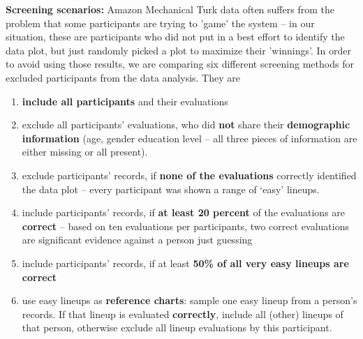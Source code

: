 \documentclass{article}
\newcommand{\hh}[1]{{\color{orange} #1}} %
\begin{document}
{\bf Screening scenarios:} \hh{Amazon Mechanical Turk data often suffers from the problem that some participants are trying to 'game' the system -- in our situation, these are participants who did not put in a best effort to identify the data plot, but just randomly picked a plot to maximize their 'winnings'.  In order to avoid using those results, we are comparing six different screening methods for excluded participants from the data analysis.} 
They are 
\begin{enumerate}
\item {\bf include all participants} and their evaluations
\item exclude all participants' evaluations, who did {\bf not} share their {\bf demographic information} (age, gender education level -- all three pieces of information are either missing or all present).
\item exclude participants' records, if {\bf none of the evaluations}  correctly identified the data plot -- every participant was shown a range of `easy' lineups.
\item include participants' records, if   {\bf at least 20 percent} of the evaluations are {\bf correct}  -- based on ten evaluations per participants, two correct evaluations are significant evidence against a person just guessing
\item include participants' records, if at least {\bf 50\% of all very easy lineups are correct} 
\item use easy lineups as {\bf reference charts}: sample one easy lineup from a person's records. If that lineup is evaluated {\bf correctly}, include all (other) lineups of that person, otherwise exclude all lineup evaluations by this participant.
\end{enumerate}
\end{document}
